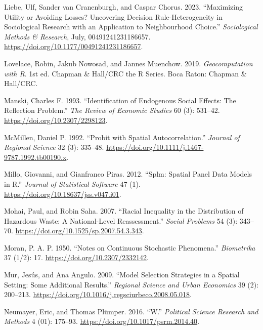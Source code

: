 \documentclass[
  letterpaper,
]{scrbook}
\newlength{\cslhangindent}
\newlength{\cslentryspacingunit} %
\newenvironment{CSLReferences}[2] %
 {%
  \setlength{\parindent}{0pt}
  \ifodd #1
  \let\oldpar\par
  \def\par{\hangindent=\cslhangindent\oldpar}
  \fi
  \setlength{\parskip}{#2\cslentryspacingunit}
 }%
 {}
\begin{document}
\begin{CSLReferences}{1}{0}
\leavevmode{}%
Liebe, Ulf, Sander van Cranenburgh, and Caspar Chorus. 2023.
{``Maximizing {Utility} or {Avoiding Losses}? {Uncovering Decision
Rule-Heterogeneity} in {Sociological Research} with an {Application} to
{Neighbourhood Choice}.''} \emph{Sociological Methods \& Research},
July, 00491241231186657.
\url{https://doi.org/10.1177/00491241231186657}.

\leavevmode{}%
Lovelace, Robin, Jakub Nowosad, and Jannes Muenchow. 2019.
\emph{Geocomputation with {R}}. 1st ed. Chapman \& {Hall}/{CRC} the {R}
Series. {Boca Raton}: {Chapman \& Hall/CRC}.

\leavevmode{}%
Manski, Charles F. 1993. {``Identification of Endogenous Social Effects:
{The} Reflection Problem.''} \emph{The Review of Economic Studies} 60
(3): 531--42. \url{https://doi.org/10.2307/2298123}.

\leavevmode{}%
McMillen, Daniel P. 1992. {``Probit with {Spatial Autocorrelation}.''}
\emph{Journal of Regional Science} 32 (3): 335--48.
\url{https://doi.org/10.1111/j.1467-9787.1992.tb00190.x}.

\leavevmode{}%
Millo, Giovanni, and Gianfranco Piras. 2012. {``Splm: {Spatial Panel
Data Models} in {R}.''} \emph{Journal of Statistical Software} 47 (1).
\url{https://doi.org/10.18637/jss.v047.i01}.

\leavevmode{}%
Mohai, Paul, and Robin Saha. 2007. {``Racial {Inequality} in the
{Distribution} of {Hazardous Waste}: {A National-Level Reassessment}.''}
\emph{Social Problems} 54 (3): 343--70.
\url{https://doi.org/10.1525/sp.2007.54.3.343}.

\leavevmode{}%
Moran, P. A. P. 1950. {``Notes on {Continuous Stochastic Phenomena}.''}
\emph{Biometrika} 37 (1/2): 17. \url{https://doi.org/10.2307/2332142}.

\leavevmode{}%
Mur, Jesús, and Ana Angulo. 2009. {``Model {Selection Strategies} in a
{Spatial Setting}: {Some Additional Results}.''} \emph{Regional Science
and Urban Economics} 39 (2): 200--213.
\url{https://doi.org/10.1016/j.regsciurbeco.2008.05.018}.

\leavevmode{}%
Neumayer, Eric, and Thomas Plümper. 2016. {``W.''} \emph{Political
Science Research and Methods} 4 (01): 175--93.
\url{https://doi.org/10.1017/psrm.2014.40}.


\end{CSLReferences}
\end{document}
